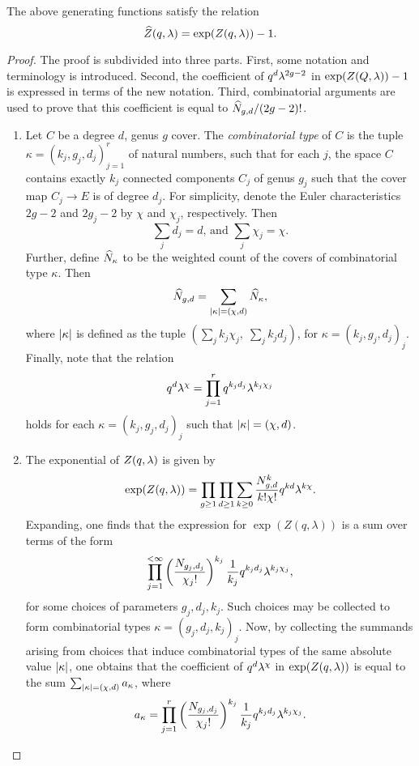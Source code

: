 \begin{lemma} \label{prop:connection-reduction}
 The above generating functions satisfy the relation \[\widehat{Z}(q,\lambda) = \exp(Z(q,\lambda)) - 1.\]
\end{lemma}
\begin{proof}
The proof is subdivided into three parts. First, some notation and terminology is introduced. Second, the coefficient of $q^{d}\lambda^{2g-2}$ in $\exp(Z(Q,\lambda)) - 1$ is expressed in terms of the new notation. Third, combinatorial arguments are used to prove that this coefficient is equal to $\widehat{N}_{g,d}/(2g-2)!$.
\begin{enumerate}

 \item Let $C$ be a degree $d$, genus $g$ cover. The \emph{combinatorial type} of $C$ is the tuple $\kappa=(k_j,g_j,d_j)_{j=1}^r$ of natural numbers, such that for each $j$, the space $C$ contains exactly $k_j$ connected components $C_j$ of genus $g_j$ such that the cover map $C_j\to E$ is of degree $d_j$. For simplicity, denote the Euler characteristics $2g-2$ and $2g_j-2$ by $\chi$ and $\chi_j$, respectively. Then
 \[\sum_j d_j=d\text{, and }\sum_j \chi_j=\chi.\]
 Further, define $\widehat{N}_\kappa$ to be the weighted count of the covers of combinatorial type $\kappa$. Then
 \[
  \widehat{N}_{g,d}=\sum_{|\kappa|=(\chi,d)}\widehat{N}_\kappa,
 \]
 where $|\kappa|$ is defined as the tuple $(\sum_j k_j\chi_j,\;\sum_j k_jd_j)$, for $\kappa=(k_j,g_j,d_j)_j$.
 Finally, note that the relation
 \[
  q^d\lambda^\chi=\prod_{j=1}^r q^{k_jd_j}\lambda^{k_j\chi_j}
 \]
 holds for each $\kappa=(k_j,g_j,d_j)_j$ such that $|\kappa|=(\chi,d)$.
 
 \item The exponential of $Z(q,\lambda)$ is given by 
 \[
  \exp(Z(q,\lambda))=\prod_{g\geq 1}\prod_{d\geq 1}\sum_{k\geq 0}\frac{N^k_{g,d}}{k!\chi!}q^{kd}\lambda^{k\chi}.
 \]
 Expanding, one finds that the expression for $\exp(Z(q,\lambda))$ is a sum over terms of the form
 \[
  \prod_{j=1}^{<\infty}\left(\frac{N_{g_j,d_j}}{\chi_j!}\right)^{k_j}\frac{1}{k_j}q^{k_jd_j}\lambda^{k_j\chi_j},
 \]
 for some choices of parameters $g_j, d_j, k_j$. Such choices may be collected to form combinatorial types $\kappa=(g_j,d_j,k_j)_j$. Now, by collecting the summands arising from choices that induce combinatorial types of the same absolute value $|\kappa|$, one obtains that the coefficient of $q^d\lambda^\chi$ in $\exp(Z(q,\lambda))$ is equal to the sum $\sum_{|\kappa|=(\chi,d)}a_\kappa$, where 
 \[
  a_\kappa=\prod_{j=1}^{r}\left(\frac{N_{g_j,d_j}}{\chi_j!}\right)^{k_j}\frac{1}{k_j}q^{k_jd_j}\lambda^{k_j\chi_j}.
 \]
 

\end{enumerate}
\end{proof}
